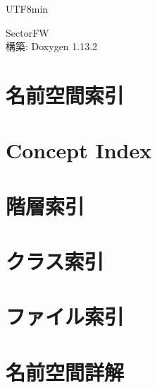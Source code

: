 \documentclass[twoside]{book}
\newcommand{\+}{\discretionary{\mbox{\scriptsize$\hookleftarrow$}}{}{}}
\newcommand{\clearemptydoublepage}{%
    \newpage{\pagestyle{empty}\cleardoublepage}%
  }
\begin{document}
  \raggedbottom
  \begin{CJK}{UTF8}{min}
    \hypersetup{pageanchor=false,
                bookmarksnumbered=true,
                pdfencoding=unicode
               }
  \begin{titlepage}
  \vspace*{7cm}
  \begin{center}%
  {\Large Sector\+FW}\\
  \vspace*{1cm}
  {\large 構築\+: Doxygen 1.13.2}\\
  \end{center}
  \end{titlepage}
  \clearemptydoublepage
  \tableofcontents
  \clearemptydoublepage
  \hypersetup{pageanchor=true}
\chapter{名前空間索引}

\chapter{Concept Index}

\chapter{階層索引}

\chapter{クラス索引}

\chapter{ファイル索引}

\chapter{名前空間詳解}



















\end{CJK}
\end{document}
